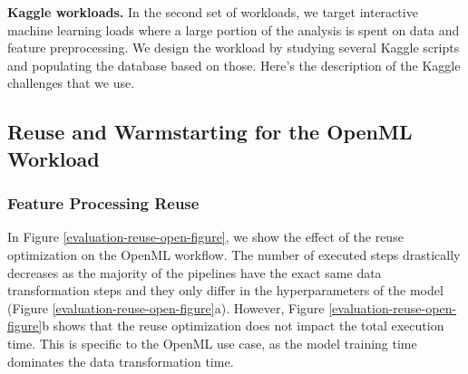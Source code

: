 \textbf{Kaggle workloads.} In the second set of workloads, we target interactive machine learning loads where a large portion of the analysis is spent on data and feature preprocessing.
We design the workload by studying several Kaggle scripts and populating the database based on those.
Here's the description of the Kaggle challenges that we use.

\subsection{Reuse and Warmstarting for the OpenML Workload}
\subsubsection{Feature Processing Reuse}  
In Figure \ref{evaluation-reuse-open-figure}, we show the effect of the reuse optimization on the OpenML workflow.
The number of executed steps drastically decreases as the majority of the pipelines have the exact same data transformation steps and they only differ in the hyperparameters of the model (Figure \ref{evaluation-reuse-open-figure}a).
However, Figure \ref{evaluation-reuse-open-figure}b shows that the reuse optimization does not impact the total execution time.
This is specific to the OpenML use case, as the model training time dominates the data transformation time.


